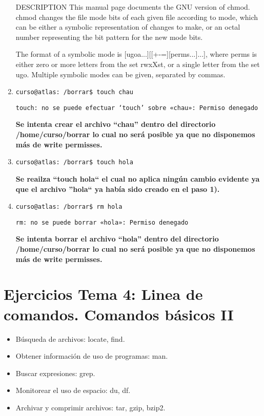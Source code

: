 \documentclass[a4paper,11pt,spanish]{article} %
\begin{document}
\begin{enumerate}
DESCRIPTION
       This  manual page documents the GNU version of chmod.  chmod changes the
       file mode bits of each given file according to mode, which can be either a symbolic
       representation of changes to make, or an octal number representing the bit
       pattern for the new mode bits.

       The format of a symbolic mode is [ugoa...][[+-=][perms...]...], where perms
       is either zero or more letters from the set rwxXst, or a single letter from  the
       set ugo.  Multiple symbolic modes can be given, separated by commas.

\item \texttt{curso@atlas:~/borrar\$ touch chau}

\texttt{touch: no se puede efectuar `touch' sobre «chau»: Permiso denegado}
 
\textbf{Se intenta crear el archivo ``chau'' dentro del directorio /home/curso/borrar
lo cual no será posible ya que no disponemos más de write permisses.}\\  
 
\item \texttt{curso@atlas:~/borrar\$ touch hola}
 
\textbf{Se reailza ``touch hola`` el cual no aplica ningún cambio evidente ya que 
el archivo ''hola`` ya había sido creado en el paso 1).}\\  
 
\item \texttt{curso@atlas:~/borrar\$ rm hola}

\texttt{rm: no se puede borrar «hola»: Permiso denegado}

\textbf{Se intenta borrar el archivo ``hola'' dentro del directorio /home/curso/borrar
lo cual no será posible ya que no disponemos más de write permisses.}\\  

\end{enumerate}

\pagebreak

\section{Ejercicios Tema 4: Linea de comandos. Comandos básicos II }

\begin{itemize}
 \item Búsqueda de archivos: locate, find.
 \item Obtener información de uso de programas: man.
 \item Buscar expresiones: grep.
 \item Monitorear el uso de espacio: du, df.
 \item Archivar y comprimir archivos: tar, gzip, bzip2.
\end{itemize}
\end{document}
